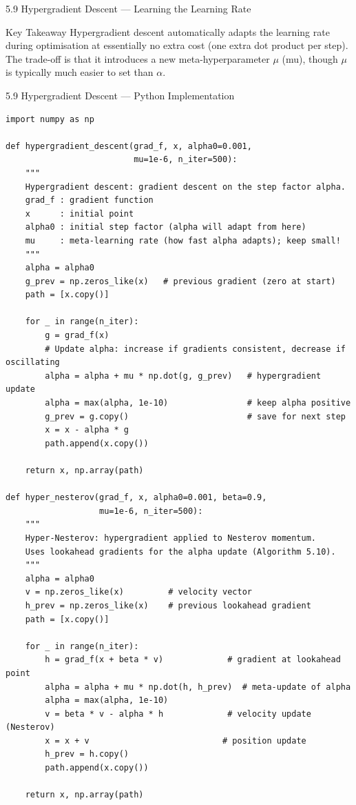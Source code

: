 \documentclass[aspectratio=169,10pt]{beamer}
\begin{document}
\begin{frame}[allowframebreaks]{5.9 Hypergradient Descent --- Learning the Learning Rate}
  \begin{alertblock}{Key Takeaway}
    Hypergradient descent automatically adapts the learning rate
    during optimisation at essentially no extra cost (one extra
    dot product per step).  The trade-off is that it introduces
    a new meta-hyperparameter $\mu$ (mu), though $\mu$ is
    typically much easier to set than $\alpha$.
  \end{alertblock}

\end{frame}

\begin{frame}[fragile]{5.9 Hypergradient Descent --- Python Implementation}
\begin{lstlisting}[caption={Hypergradient Descent and Hyper-Nesterov (Python/NumPy)}]
import numpy as np

def hypergradient_descent(grad_f, x, alpha0=0.001,
                          mu=1e-6, n_iter=500):
    """
    Hypergradient descent: gradient descent on the step factor alpha.
    grad_f : gradient function
    x      : initial point
    alpha0 : initial step factor (alpha will adapt from here)
    mu     : meta-learning rate (how fast alpha adapts); keep small!
    """
    alpha = alpha0
    g_prev = np.zeros_like(x)   # previous gradient (zero at start)
    path = [x.copy()]

    for _ in range(n_iter):
        g = grad_f(x)
        # Update alpha: increase if gradients consistent, decrease if oscillating
        alpha = alpha + mu * np.dot(g, g_prev)   # hypergradient update
        alpha = max(alpha, 1e-10)                # keep alpha positive
        g_prev = g.copy()                        # save for next step
        x = x - alpha * g
        path.append(x.copy())

    return x, np.array(path)

def hyper_nesterov(grad_f, x, alpha0=0.001, beta=0.9,
                   mu=1e-6, n_iter=500):
    """
    Hyper-Nesterov: hypergradient applied to Nesterov momentum.
    Uses lookahead gradients for the alpha update (Algorithm 5.10).
    """
    alpha = alpha0
    v = np.zeros_like(x)         # velocity vector
    h_prev = np.zeros_like(x)    # previous lookahead gradient
    path = [x.copy()]

    for _ in range(n_iter):
        h = grad_f(x + beta * v)             # gradient at lookahead point
        alpha = alpha + mu * np.dot(h, h_prev)  # meta-update of alpha
        alpha = max(alpha, 1e-10)
        v = beta * v - alpha * h             # velocity update (Nesterov)
        x = x + v                           # position update
        h_prev = h.copy()
        path.append(x.copy())

    return x, np.array(path)
\end{lstlisting}
\end{frame}
\end{document}
